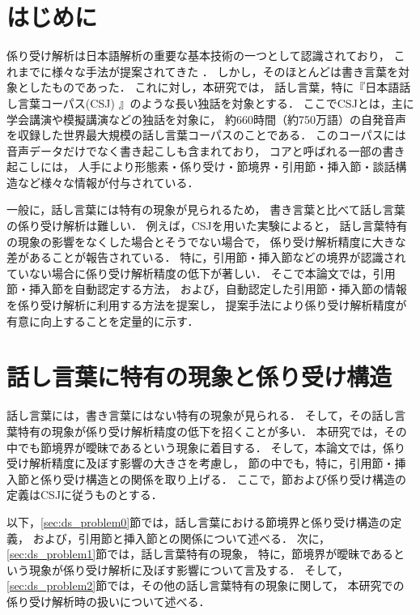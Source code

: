 \documentclass[japanese]{jnlp_1.4}
\begin{document}
\maketitle

\section{はじめに}\label{sec:first}

係り受け解析は日本語解析の重要な基本技術の一つとして認識されており，
これまでに様々な手法が提案されてきた
\cite{Kurohashi:94,SShirai:95,fujio_97,haruno,uchimoto_99,uchimoto_2000,kudo_2000,Kudo:2002,matsubara,Kudo:2004,Kawahara:naacl2006,Ohno:coling-acl2006}．
しかし，そのほとんどは書き言葉を対象としたものであった．
これに対し，本研究では，
話し言葉，特に『日本語話し言葉コーパス(CSJ) \cite{furui}』のような長い独話を対象とする．
ここでCSJとは，主に学会講演や模擬講演などの独話を対象に，
約660時間（約750万語）の自発音声を収録した世界最大規模の話し言葉コーパスのことである．
このコーパスには音声データだけでなく書き起こしも含まれており，
コアと呼ばれる一部の書き起こしには，
人手により形態素・係り受け・節境界・引用節・挿入節・談話構造など様々な情報が付与されている．

一般に，話し言葉には特有の現象が見られるため，
書き言葉と比べて話し言葉の係り受け解析は難しい．
例えば，CSJを用いた実験によると，
話し言葉特有の現象の影響をなくした場合とそうでない場合で，
係り受け解析精度に大きな差があることが報告されている\cite{Uchimoto:lrec2006a}．
特に，引用節・挿入節などの境界が認識されていない場合に係り受け解析精度の低下が著しい．
そこで本論文では，引用節・挿入節を自動認定する方法，
および，自動認定した引用節・挿入節の情報を係り受け解析に利用する方法を提案し，
提案手法により係り受け解析精度が有意に向上することを定量的に示す．


\section{話し言葉に特有の現象と係り受け構造}\label{sec:ds_problem}

話し言葉には，書き言葉にはない特有の現象が見られる．
そして，その話し言葉特有の現象が係り受け解析精度の低下を招くことが多い．
本研究では，その中でも節境界が曖昧であるという現象に着目する．
そして，本論文では，係り受け解析精度に及ぼす影響の大きさを考慮し，
節の中でも，特に，引用節・挿入節と係り受け構造との関係を取り上げる．
ここで，節および係り受け構造の定義はCSJに従うものとする．

以下，\ref{sec:ds_problem0}節では，話し言葉における節境界と係り受け構造の定義，
および，引用節と挿入節との関係について述べる．
次に，\ref{sec:ds_problem1}節では，話し言葉特有の現象，
特に，節境界が曖昧であるという現象が係り受け解析に及ぼす影響について言及する．
そして，\ref{sec:ds_problem2}節では，その他の話し言葉特有の現象に関して，
本研究での係り受け解析時の扱いについて述べる．
\end{document}
